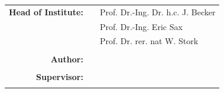 \begin{titlepage}
\begin{minipage}{15cm}
\begin{center}
\vspace{0.5cm}
\Large
\abgabe
\end{center}
%
\vspace{2.5cm}

\begin{tabular}{rcl}
\bfseries Head of Institute: 
&& Prof. Dr.-Ing. Dr. h.c. J. Becker\\
&& Prof. Dr.-Ing. Eric Sax\\
&& Prof. Dr. rer. nat  W. Stork\\

 \\
	\bfseries Author:         && \nameprefix \leerzeichen \docauthor \\

 \\
	\bfseries Supervisor:       &&\nameprefix  \betreuerA \\
											      && \nameprefixb  \betreuerB \\
\end{tabular}											
\end{minipage}
\end{titlepage}